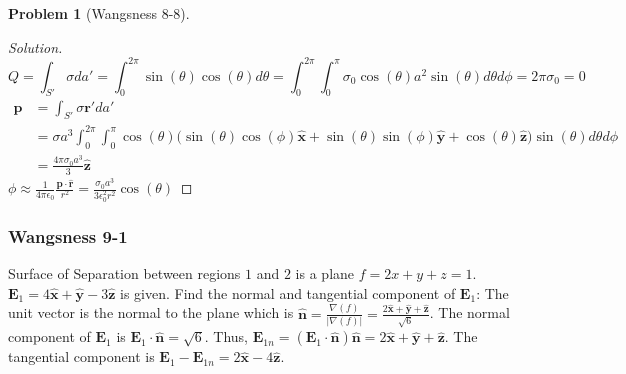 \documentclass[oneside]{book}
\theoremstyle{mystyle}
\newtheorem{problem}{Problem}[section]
\begin{document}
\begin{problem}[Wangsness 8-8]
\end{problem}
\begin{proof}[Solution]
\begin{equation*}
    Q = \int_{S'} \sigma da'= \int_{0}^{2\pi} \sin(\theta)\cos(\theta)d\theta = \int_{0}^{2\pi} \int_{0}^{\pi} \sigma_{0} \cos(\theta) a^2 \sin(\theta) d\theta d\phi = 2\pi \sigma_{0} = 0
\end{equation*}
\begin{align*}
    \mathbf{p} &= \int_{S'}\sigma \mathbf{r}' da'\\
    &= \sigma a^{3}\int_{0}^{2\pi} \int_{0}^{\pi} \cos(\theta) \big(\sin(\theta) \cos(\phi) \hat{\mathbf{x}} + \sin(\theta)\sin(\phi) \hat{\mathbf{y}} + \cos(\theta) \hat{\mathbf{z}}\big)\sin(\theta)d\theta d\phi\\
    &= \frac{4\pi \sigma_0 a^3}{3} \hat{\mathbf{z}}
\end{align*}
$\phi \approx \frac{1}{4\pi \epsilon_0} \frac{\mathbf{p}\cdot \hat{\mathbf{r}}}{r^2} = \frac{\sigma_0 a^3}{3\epsilon_0^2 r^2}\cos(\theta)$
\end{proof}
\subsubsection{Wangsness 9-1}
Surface of Separation between regions $1$ and $2$ is a plane $f=2x+y+z=1$. $\mathbf{E}_1 = 4\hat{\mathbf{x}}+\hat{\mathbf{y}}-3\hat{\mathbf{z}}$ is given. Find the normal and tangential component of $\mathbf{E}_1$: The unit vector is the normal to the plane which is $\hat{\mathbf{n}}=\frac{\nabla(f)}{|\nabla(f)|} = \frac{2\hat{\mathbf{x}}+\hat{\mathbf{y}}+\hat{\mathbf{z}}}{\sqrt{6}}$. The normal component of $\mathbf{E}_1$ is $\mathbf{E}_1 \cdot \hat{\mathbf{n}} = \sqrt{6}$. Thus, $\mathbf{E}_{1n} = (\mathbf{E}_1 \cdot \hat{\mathbf{n}})\hat{\mathbf{n}} = 2\hat{\mathbf{x}}+\hat{\mathbf{y}}+\hat{\mathbf{z}}$. The tangential component is $\mathbf{E}_1 - \mathbf{E}_{1n} = 2\hat{\mathbf{x}}-4\hat{\mathbf{z}}$.
\end{document}
